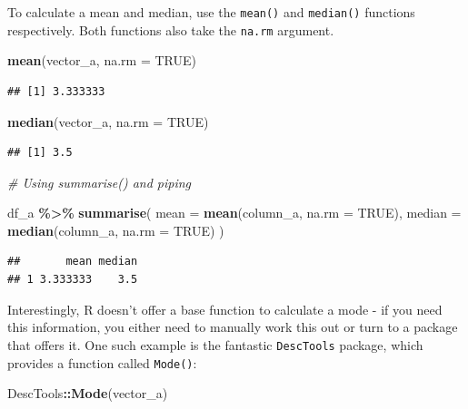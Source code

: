 \documentclass[
]{book}
\newenvironment{Shaded}{\begin{snugshade}}{\end{snugshade}}
\newcommand{\AttributeTok}[1]{\textcolor[rgb]{0.13,0.29,0.53}{#1}}
\newcommand{\CommentTok}[1]{\textcolor[rgb]{0.56,0.35,0.01}{\textit{#1}}}
\newcommand{\ConstantTok}[1]{\textcolor[rgb]{0.56,0.35,0.01}{#1}}
\newcommand{\FunctionTok}[1]{\textcolor[rgb]{0.13,0.29,0.53}{\textbf{#1}}}
\newcommand{\NormalTok}[1]{#1}
\newcommand{\SpecialCharTok}[1]{\textcolor[rgb]{0.81,0.36,0.00}{\textbf{#1}}}
\begin{document}
To calculate a mean and median, use the \texttt{mean()} and \texttt{median()} functions respectively. Both functions also take the \texttt{na.rm} argument.

\begin{Shaded}
\begin{Highlighting}[]
\FunctionTok{mean}\NormalTok{(vector\_a, }\AttributeTok{na.rm =} \ConstantTok{TRUE}\NormalTok{)}
\end{Highlighting}
\end{Shaded}

\begin{verbatim}
## [1] 3.333333
\end{verbatim}

\begin{Shaded}
\begin{Highlighting}[]
\FunctionTok{median}\NormalTok{(vector\_a, }\AttributeTok{na.rm =} \ConstantTok{TRUE}\NormalTok{)}
\end{Highlighting}
\end{Shaded}

\begin{verbatim}
## [1] 3.5
\end{verbatim}

\begin{Shaded}
\begin{Highlighting}[]
\CommentTok{\# Using summarise() and piping}

\NormalTok{df\_a }\SpecialCharTok{\%\textgreater{}\%}
  \FunctionTok{summarise}\NormalTok{(}
    \AttributeTok{mean =} \FunctionTok{mean}\NormalTok{(column\_a, }\AttributeTok{na.rm =} \ConstantTok{TRUE}\NormalTok{),}
    \AttributeTok{median =} \FunctionTok{median}\NormalTok{(column\_a, }\AttributeTok{na.rm =} \ConstantTok{TRUE}\NormalTok{)}
\NormalTok{  )}
\end{Highlighting}
\end{Shaded}

\begin{verbatim}
##       mean median
## 1 3.333333    3.5
\end{verbatim}

Interestingly, R doesn't offer a base function to calculate a mode - if you need this information, you either need to manually work this out or turn to a package that offers it. One such example is the fantastic \texttt{DescTools} package, which provides a function called \texttt{Mode()}:

\begin{Shaded}
\begin{Highlighting}[]
\NormalTok{DescTools}\SpecialCharTok{::}\FunctionTok{Mode}\NormalTok{(vector\_a)}
\end{Highlighting}
\end{Shaded}
\end{document}
